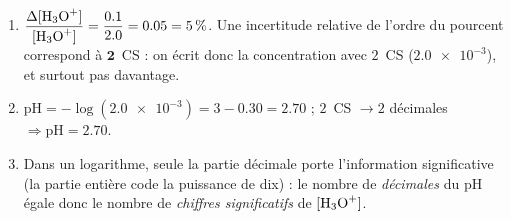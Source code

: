\documentclass[11pt,a4paper]{article}
\newcommand{\CS}{chiffres significatifs}
\begin{document}
\begin{cor}
\begin{enumerate}[label=\alph*),leftmargin=1.6em,itemsep=1pt]
  \item $\dfrac{\Delta[\ce{H3O+}]}{[\ce{H3O+}]}=\dfrac{\num{0,1}}{\num{2,0}}=\num{0,05}=\qty{5}{\percent}$.
        Une incertitude relative de l'ordre du pourcent correspond à $\mathbf{2}$~CS : on écrit donc la
        concentration avec $2$~CS ($\num{2,0e-3}$), et surtout pas davantage.
  \item $\mathrm{pH}=-\log(\num{2,0e-3})=3-\num{0,30}=\num{2,70}$ ; $2$~CS $\to 2$ décimales
        $\Rightarrow \boxed{\mathrm{pH}=\num{2,70}}$.
  \item Dans un logarithme, seule la partie décimale porte l'information significative (la partie
        entière code la puissance de dix) : le nombre de \emph{décimales} du pH égale donc le nombre
        de \emph{\CS} de $[\ce{H3O+}]$.
\end{enumerate}
\end{cor}
\end{document}
